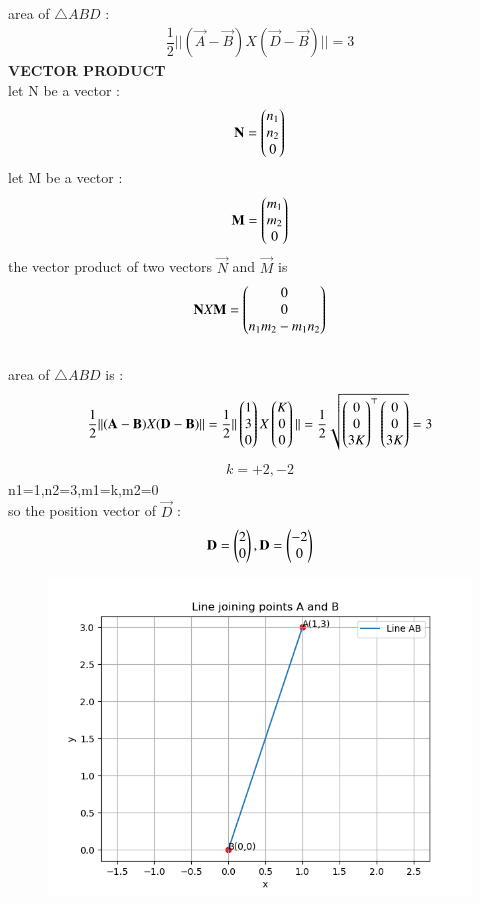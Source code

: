 \documentclass[journal,12pt,onecolumn]{IEEEtran}
\begin{document}
area of $\triangle ABD $ : 
\\
\begin{align*}
    \dfrac{1}{2}||(\vec{A}- \vec{B})X(\vec{D}- \vec{B})||=3
\end{align*}
\textbf{VECTOR PRODUCT}
\\
let N be a vector :
\begin{align}
    \mathbf{N}=\begin{pmatrix}n_1\\n_2\\0\end{pmatrix}
    \\
    \end{align}
    let M be a vector :
    \begin{align}
    \mathbf{M}=\begin{pmatrix}m_1\\m_2\\0\end{pmatrix}
\end{align}
the vector product of two vectors $\vec{N}$ and $\vec{M}$ is 
\\
\begin{align*}
    \mathbf{N}X\mathbf{M}=\begin{pmatrix}0\\0\\n_1m_2-m_1n_2\end{pmatrix}
\end{align*}
\\
{area of $\triangle ABD$ is :}
\begin{align*}
    \dfrac{1}{2}||(\mathbf{A}-  \mathbf{B})X(\mathbf{D} -  \mathbf{B})||=\dfrac{1}{2}||\begin{pmatrix}1\\3\\0\end{pmatrix}X\begin{pmatrix}
    K\\0\\0\end{pmatrix}||= \dfrac{1}{2}\sqrt{\begin{pmatrix}0\\0\\3K\end{pmatrix}^\top\begin{pmatrix}0\\0\\3K\end{pmatrix}}=3
    \end{align*}
    \begin{align*}
        k=+2,-2
    \end{align*}
    n1=1,n2=3,m1=k,m2=0
\\

    so the position vector of $\vec{D}$ :
    \begin{align*}
        \mathbf{D}=\begin{pmatrix}2\\0\end{pmatrix},\mathbf{D}=\begin{pmatrix}-2\\0\end{pmatrix}
    \end{align*}

        \begin{figure}[H]
    \centering
    \includegraphics[width = 0.7\columnwidth]{figs1/img.png}
    \caption*{}
    \label{figs}
\end{figure}
\end{document}
